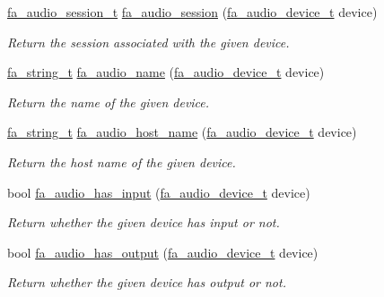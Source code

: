 \begin{DoxyCompactItemize}
\hyperlink{group___fa_audio_session_ga62ee22268c23f1b18447141feccc01e0}{fa\-\_\-audio\-\_\-session\-\_\-t} \hyperlink{group___fa_audio_device_ga75ce8ffa723a549c4ea41b7ead4fcb9b}{fa\-\_\-audio\-\_\-session} (\hyperlink{group___fa_audio_device_ga03de89ee66c6465f8cedd3a0286598f4}{fa\-\_\-audio\-\_\-device\-\_\-t} device)
\begin{DoxyCompactList}\small\item\em Return the session associated with the given device. \end{DoxyCompactList}\item 
\hyperlink{group___fa_string_gacada63033b77bc6c39fa632ae199349b}{fa\-\_\-string\-\_\-t} \hyperlink{group___fa_audio_device_ga8e04c8feea7e664d2c7de9c9e57a5f4e}{fa\-\_\-audio\-\_\-name} (\hyperlink{group___fa_audio_device_ga03de89ee66c6465f8cedd3a0286598f4}{fa\-\_\-audio\-\_\-device\-\_\-t} device)
\begin{DoxyCompactList}\small\item\em Return the name of the given device. \end{DoxyCompactList}\item 
\hyperlink{group___fa_string_gacada63033b77bc6c39fa632ae199349b}{fa\-\_\-string\-\_\-t} \hyperlink{group___fa_audio_device_ga3263e679dfa30fcd21042528782507d8}{fa\-\_\-audio\-\_\-host\-\_\-name} (\hyperlink{group___fa_audio_device_ga03de89ee66c6465f8cedd3a0286598f4}{fa\-\_\-audio\-\_\-device\-\_\-t} device)
\begin{DoxyCompactList}\small\item\em Return the host name of the given device. \end{DoxyCompactList}\item 
bool \hyperlink{group___fa_audio_device_gacd32b5e58c2b79df883a64d4012302ae}{fa\-\_\-audio\-\_\-has\-\_\-input} (\hyperlink{group___fa_audio_device_ga03de89ee66c6465f8cedd3a0286598f4}{fa\-\_\-audio\-\_\-device\-\_\-t} device)
\begin{DoxyCompactList}\small\item\em Return whether the given device has input or not. \end{DoxyCompactList}\item 
bool \hyperlink{group___fa_audio_device_ga2ca67bc0e45609675bb064849d20dba6}{fa\-\_\-audio\-\_\-has\-\_\-output} (\hyperlink{group___fa_audio_device_ga03de89ee66c6465f8cedd3a0286598f4}{fa\-\_\-audio\-\_\-device\-\_\-t} device)
\begin{DoxyCompactList}\small\item\em Return whether the given device has output or not. \end{DoxyCompactList}\item 

\end{DoxyCompactItemize}
